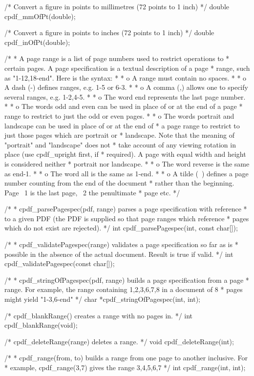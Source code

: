 /* Convert a figure in points to millimetres (72 points to 1 inch) */
double cpdf_mmOfPt(double);

/* Convert a figure in points to inches (72 points to 1 inch) */
double cpdf_inOfPt(double);

/*
 * A page range is a list of page numbers used to restrict operations to
 * certain pages. A page specification is a textual description of a page
 * range, such as "1-12,18-end". Here is the syntax:
 *
 * o A range must contain no spaces.
 *
 * o A dash (-) defines ranges, e.g. 1-5 or 6-3.
 *
 * o A comma (,) allows one to specify several ranges, e.g. 1-2,4-5.
 *
 * o The word end represents the last page number.
 *
 * o The words odd and even can be used in place of or at the end of a page
 * range to restrict to just the odd or even pages.
 *
 * o The words portrait and landscape can be used in place of or at the end of
 * a page range to restrict to just those pages which are portrait or
 * landscape. Note that the meaning of "portrait" and "landscape" does not
 * take account of any viewing rotation in place (use cpdf_upright first, if
 * required). A page with equal width and height is considered neither
 * portrait nor landscape.
 *
 * o The word reverse is the same as end-1.
 *
 * o The word all is the same as 1-end.
 *
 * o A tilde (~) defines a page number counting from the end of the document
 * rather than the beginning. Page ~1 is the last page, ~2 the penultimate
 * page etc.
 */

/*
 * cpdf_parsePagespec(pdf, range) parses a page specification with reference
 * to a given PDF (the PDF is supplied so that page ranges which reference
 * pages which do not exist are rejected).
 */
int cpdf_parsePagespec(int, const char[]);

/*
 * cpdf_validatePagespec(range) validates a page specification so far as is
 * possible in the absence of the actual document. Result is true if valid.
 */
int cpdf_validatePagespec(const char[]);

/*
 * cpdf_stringOfPagespec(pdf, range) builds a page specification from a page
 * range. For example, the range containing 1,2,3,6,7,8 in a document of 8
 * pages might yield "1-3,6-end"
 */
char *cpdf_stringOfPagespec(int, int);

/* cpdf_blankRange() creates a range with no pages in. */
int cpdf_blankRange(void);

/* cpdf_deleteRange(range) deletes a range. */
void cpdf_deleteRange(int);

/*
 * cpdf_range(from, to) builds a range from one page to another inclusive. For
 * example, cpdf_range(3,7) gives the range 3,4,5,6,7
 */
int cpdf_range(int, int);

